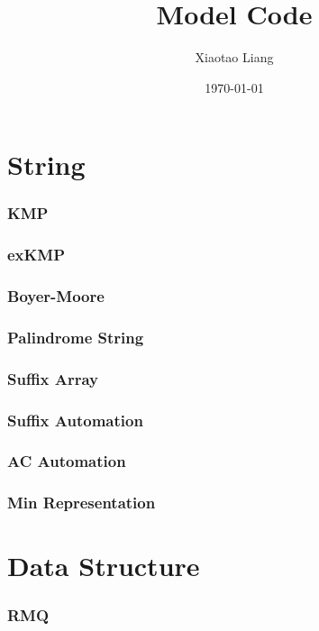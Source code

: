 \documentclass[a4paper, twocolumn, landscape]{article}
\title{\textbf{Model Code}}
\author{Xiaotao Liang}
\date{\today}
\begin{document}
\small
\maketitle
\tableofcontents

\part{String}
\section{KMP}

\section{exKMP}

\section{Boyer-Moore}

\section{Palindrome String}

\section{Suffix Array}

\section{Suffix Automation}

\section{AC Automation}

\section{Min Representation}


\part{Data Structure}
\section{RMQ}

\end{document}
